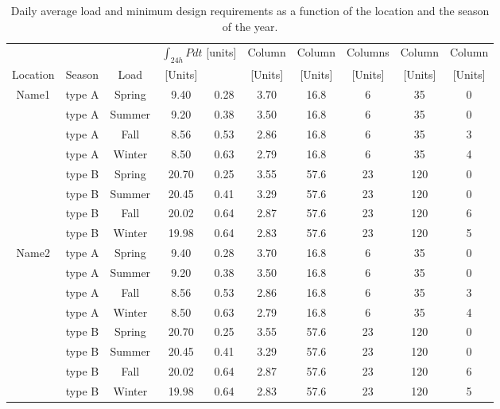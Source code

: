\documentclass[journal, twoside]{IEEEtran}
\begin{document}
\begin{figure}[h]
   \end{figure}

      
      
\begin{table}[h]
\caption{Daily average load and  minimum design requirements as a function of the location and the season of the year.}
\label{table_minimumsurface}
\centering
\resizebox{18cm}{!} {
\begin{tabular}{cccccccccc}
\hline
\hline
	&		&		&		\multicolumn{2}{c}{$\int_{24h} P dt$\hspace{2mm} [units]}	& Column	&	Column &	Columns	&	Column	&	Column 		\\
Location	&	Season	&	Load	&[Units]	&		& [Units]	&  [Units]	&	 [Units]&	[Units] 	&	[Units] \\
\hline
Name1	&	type A	&	Spring	&	9.40	&	0.28	&	3.70	&	16.8	&	6	&	35	&	0	\\
	&	type A	&	Summer	&	9.20	&	0.38	&	3.50	&	16.8	&	6	&	35	&	0	\\
	&	type A	&	Fall	&	8.56	&	0.53	&	2.86	&	16.8	&	6	&	35	&	3	\\
	&	type A	&	Winter	&	8.50	&	0.63	&	2.79	&	16.8	&	6	&	35	&	4	\\
	&	type B	&	Spring	&	20.70	&	0.25	&	3.55	&	57.6	&	23	&	120	&	0	\\
	&	type B	&	Summer	&	20.45	&	0.41	&	3.29	&	57.6	&	23	&	120	&	0	\\
	&	type B	&	Fall	&	20.02	&	0.64	&	2.87	&	57.6	&	23	&	120	&	6	\\
	&	type B	&	Winter	&	19.98	&	0.64	&	2.83	&	57.6	&	23	&	120	&	5	\\
	Name2	&	type A	&	Spring	&	9.40	&	0.28	&	3.70	&	16.8	&	6	&	35	&	0	\\
	&	type A	&	Summer	&	9.20	&	0.38	&	3.50	&	16.8	&	6	&	35	&	0	\\
	&	type A	&	Fall	&	8.56	&	0.53	&	2.86	&	16.8	&	6	&	35	&	3	\\
	&	type A	&	Winter	&	8.50	&	0.63	&	2.79	&	16.8	&	6	&	35	&	4	\\
	&	type B	&	Spring	&	20.70	&	0.25	&	3.55	&	57.6	&	23	&	120	&	0	\\
	&	type B	&	Summer	&	20.45	&	0.41	&	3.29	&	57.6	&	23	&	120	&	0	\\
	&	type B	&	Fall	&	20.02	&	0.64	&	2.87	&	57.6	&	23	&	120	&	6	\\
	&	type B	&	Winter	&	19.98	&	0.64	&	2.83	&	57.6	&	23	&	120	&	5	\\
\hline
\hline
\end{tabular}}
\end{table}
      
\end{document}
